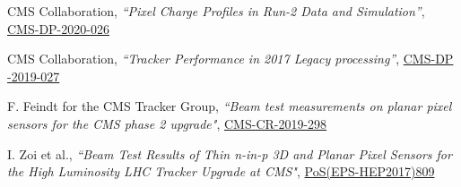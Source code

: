   
    \begin{refsection}
      \vspace{2mm}
      \onehalfspacing
CMS Collaboration, {\sl ``Pixel Charge Profiles in Run-2 Data and Simulation''},
\href{https://cds.cern.ch/record/2720551/files/DP2020_026.pdf}{CMS-DP-2020-026}
    \end{refsection}

      \begin{refsection}
      \vspace{2mm}
      \onehalfspacing
CMS Collaboration, {\sl ``Tracker Performance in 2017 Legacy processing''},
\href{http://cds.cern.ch/record/2689892/files/DP2019_027.pdf}{CMS-DP -2019-027}
    \end{refsection}


    \begin{refsection}
      \vspace{2mm}
      \onehalfspacing
       F. Feindt for the CMS Tracker Group, {\sl ``Beam test measurements on planar pixel sensors for the CMS phase 2 upgrade"}, \href{http://cds.cern.ch/record/2713732}{CMS-CR-2019-298}
    \end{refsection}
  


     
        \begin{refsection}
      \vspace{2mm}
      \onehalfspacing
      I. Zoi et al., {\sl ``Beam Test Results of Thin n-in-p 3D and Planar Pixel Sensors for the High Luminosity LHC Tracker Upgrade at CMS"}, \href{https://doi.org/10.22323/1.314.0809}{PoS(EPS-HEP2017)809}
    \end{refsection}


 
